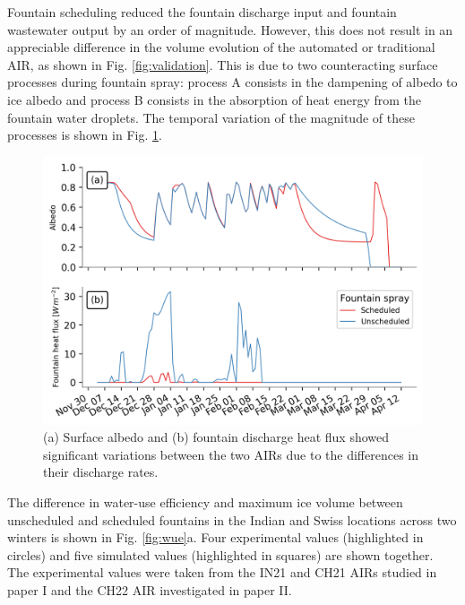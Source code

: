 Fountain scheduling reduced the fountain discharge input and fountain wastewater output by an order of
magnitude. However, this does not result in an appreciable difference in the volume evolution of the automated
or traditional AIR, as shown in Fig. \ref{fig:validation}. This is due to two counteracting surface processes
during fountain spray: process A consists in the dampening of albedo to ice albedo and process B consists in the
absorption of heat energy from the fountain water droplets. The temporal variation of the magnitude of these
processes is shown in Fig. \ref{fig:dis_processes}.

\begin{figure}[htb]
	\includegraphics[width=\textwidth]{figs/dis_processes.png}
	\caption{(a) Surface albedo  and (b) fountain discharge heat flux showed significant variations between the two
		\ac{AIRs} due to the differences in their discharge rates.}
	\label{fig:dis_processes}
\end{figure}

The difference in water-use efficiency and maximum ice volume between unscheduled and scheduled fountains in the
Indian and Swiss locations across two winters is shown in Fig. \ref{fig:wue}a. Four experimental values
(highlighted in circles) and five simulated values (highlighted in squares) are shown together.  The
experimental values were taken from the IN21 and CH21 AIRs studied in paper I and the CH22 AIR investigated in
paper II.

